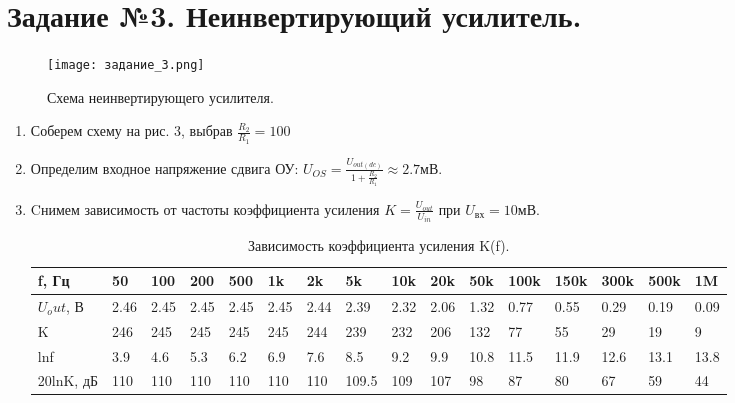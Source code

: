 \documentclass[12pt,a4paper]{article}
\begin{document}
\section{Задание №3. Неинвертирующий усилитель.}

\begin{figure}[H]
    \begin{center}
        \texttt{[image: задание\_3.png]}
        \caption{Схема неинвертирующего усилителя.}
        \label{Sallen-Ki}
    \end{center}
\end{figure}

\begin{enumerate}
\item Соберем схему на рис. 3, выбрав $\frac{R_2}{R_1} = 100$
 
\item Определим входное напряжение сдвига ОУ: $U_{OS} =\frac{U_{out(dc)}}{1+\frac{R_2}{R_1}} \approx 2.7 мВ$.
\item Cнимем зависимость от частоты коэффициента усиления $K = \frac{U_{out}}{U_{in}}$ при $U_{вх} = 10мВ$.

\begin{table}[H]
    \centering
    \begin{center}
    \end{center}
    \vspace{0.1cm}
    \label{tab:my_label}
    \begin{tabular}{|p{2cm}|p{1cm}|p{1cm}|p{1cm}|p{1cm}|p{1cm}|p{1cm}|p{1cm}|p{1cm}|p{1cm}|p{1cm}|p{1cm}|p{1cm}|p{1cm}|p{1cm}|p{1cm}|}
        \hline
        f, Гц & 50    & 100   & 200 & 500 & 1k    & 2k    & 5k    & 10k    & 20k    & 50k  & 100k & 150k &300k &500k & 1M \\ 
        \hline
        $U_out$, В  & 2.46 & 2.45 & 2.45 & 2.45  & 2.45  & 2.44  & 2.39  & 2.32   & 2.06  & 1.32 & 0.77  & 0.55 & 0.29 & 0.19 & 0.09\\
        \hline
        K    & 246 & 245 & 245  & 245  & 245   & 244   & 239    & 232    & 206   & 132 & 77 & 55 &  29 & 19 & 9 \\
        \hline
        lnf     & 3.9   & 4.6  & 5.3  & 6.2 & 6.9  & 7.6 & 8.5   & 9.2  & 9.9 &  10.8 & 11.5 & 11.9 & 12.6 & 13.1 & 13.8 \\
        \hline
        20lnK, дБ   & 110   & 110  & 110 & 110 &  110  & 110  & 109.5 &  109 & 107  & 98 & 87 & 80 & 67 & 59 & 44 \\
        \hline 
        \end{tabular}
        \caption{Зависимость коэффициента усиления K(f).}
\end{table}



\end{enumerate}
\end{document}
